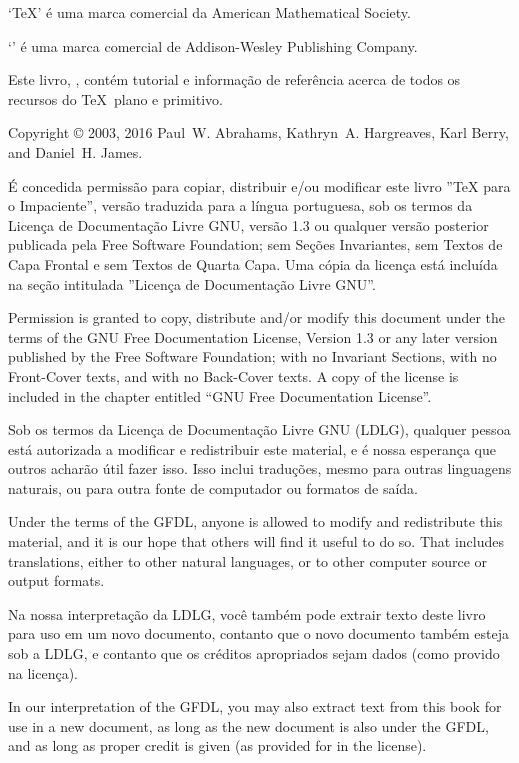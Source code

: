 



% 
\noheadlinetrue
\sinkage

\noindent `\TeX' é uma marca comercial da American Mathematical Society.

\noindent `\Metafont' é uma marca comercial de Addison-Wesley Publishing Company.

\bigskip
\noindent Este livro, \thisbook, contém tutorial e informação de 
referência acerca de todos os recursos do \TeX\ plano e primitivo.

\bigskip

\noindent Copyright \copyright{} 2003, 2016 Paul~W. Abrahams,
Kathryn~A. Hargreaves, Karl Berry, and Daniel~H. James.

\bigskip
\noindent   É concedida permissão para copiar, distribuir e/ou modificar 
este livro ''TeX para o Impaciente'', versão traduzida para a língua 
portuguesa, sob os termos da Licença de Documentação Livre GNU, versão 
1.3 ou qualquer versão posterior publicada pela Free Software 
Foundation; sem Seções Invariantes, sem Textos de Capa Frontal e sem 
Textos de Quarta Capa.   Uma cópia da licença está incluída na seção 
intitulada ''Licença de Documentação Livre GNU''.

\medskip\noindent
Permission is granted to copy, distribute and/or modify this
document under the terms of the GNU Free Documentation License, Version
1.3 or any later version published by the Free Software Foundation; with
no Invariant Sections, with no Front-Cover texts, and with no Back-Cover
texts.  A copy of the license is included in the chapter entitled ``GNU
Free Documentation License''.

\medskip\noindent
Sob os termos da Licença de Documentação Livre GNU (LDLG), qualquer 
pessoa está autorizada a modificar e redistribuir este material, e é 
nossa esperança que outros acharão útil fazer isso.  Isso inclui 
traduções, mesmo para outras linguagens naturais, ou para outra fonte de 
computador ou formatos de saída.

\medskip\noindent
Under the terms of the GFDL, anyone is allowed to modify and
redistribute this material, and it is our hope that others will find it
useful to do so.  That includes translations, either to other natural
languages, or to other computer source or output formats.

\medskip\noindent
Na nossa interpretação da LDLG, você também pode extrair texto deste 
livro para uso em um novo documento, contanto que o novo documento 
também esteja sob a LDLG, e contanto que os créditos apropriados sejam 
dados (como provido na licença).

\medskip\noindent
In our interpretation of the GFDL, you may also extract text from this
book for use in a new document, as long as the new document is also
under the GFDL, and as long as proper credit is given (as provided for
in the license).


\pagebreak
\byebye
